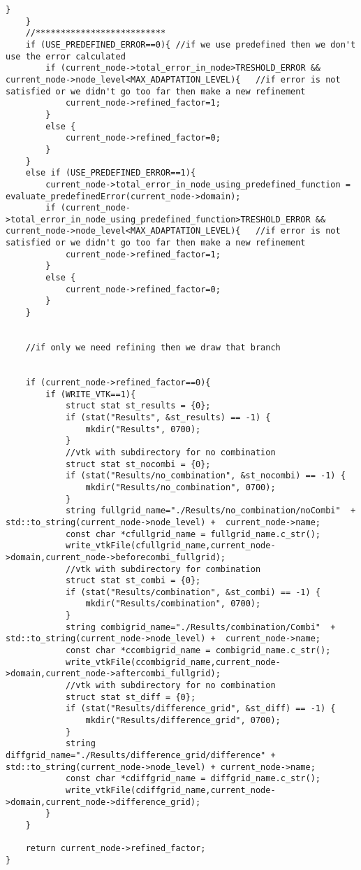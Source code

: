 \begin{lstlisting}[caption= Source code for solution, label=code:sol]
		}
	}
	//**************************
	if (USE_PREDEFINED_ERROR==0){ //if we use predefined then we don't use the error calculated
		if (current_node->total_error_in_node>TRESHOLD_ERROR && current_node->node_level<MAX_ADAPTATION_LEVEL){   //if error is not satisfied or we didn't go too far then make a new refinement
			current_node->refined_factor=1;
		}
		else {
			current_node->refined_factor=0;
		}
	}
	else if (USE_PREDEFINED_ERROR==1){
		current_node->total_error_in_node_using_predefined_function = evaluate_predefinedError(current_node->domain);
		if (current_node->total_error_in_node_using_predefined_function>TRESHOLD_ERROR && current_node->node_level<MAX_ADAPTATION_LEVEL){   //if error is not satisfied or we didn't go too far then make a new refinement
			current_node->refined_factor=1;
		}
		else {
			current_node->refined_factor=0;
		}
	}


	//if only we need refining then we draw that branch


	if (current_node->refined_factor==0){
		if (WRITE_VTK==1){
			struct stat st_results = {0};
			if (stat("Results", &st_results) == -1) {
				mkdir("Results", 0700);
			}
			//vtk with subdirectory for no combination
			struct stat st_nocombi = {0};
			if (stat("Results/no_combination", &st_nocombi) == -1) {
				mkdir("Results/no_combination", 0700);
			}
			string fullgrid_name="./Results/no_combination/noCombi"  + std::to_string(current_node->node_level) +  current_node->name;
			const char *cfullgrid_name = fullgrid_name.c_str();
			write_vtkFile(cfullgrid_name,current_node->domain,current_node->beforecombi_fullgrid);
			//vtk with subdirectory for combination
			struct stat st_combi = {0};
			if (stat("Results/combination", &st_combi) == -1) {
				mkdir("Results/combination", 0700);
			}
			string combigrid_name="./Results/combination/Combi"  + std::to_string(current_node->node_level) +  current_node->name;
			const char *ccombigrid_name = combigrid_name.c_str();
			write_vtkFile(ccombigrid_name,current_node->domain,current_node->aftercombi_fullgrid);
			//vtk with subdirectory for no combination
			struct stat st_diff = {0};
			if (stat("Results/difference_grid", &st_diff) == -1) {
				mkdir("Results/difference_grid", 0700);
			}
			string diffgrid_name="./Results/difference_grid/difference" + std::to_string(current_node->node_level) + current_node->name;
			const char *cdiffgrid_name = diffgrid_name.c_str();
			write_vtkFile(cdiffgrid_name,current_node->domain,current_node->difference_grid);
		}
	}

	return current_node->refined_factor;
}


\end{lstlisting}

